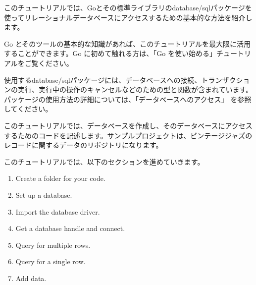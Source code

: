 このチュートリアルでは、Goとその標準ライブラリのdatabase/sqlパッケージを使ってリレーショナルデータベースにアクセスするための基本的な方法を紹介します。

Go とそのツールの基本的な知識があれば、このチュートリアルを最大限に活用することができます。Go に初めて触れる方は、「Go を使い始める」チュートリアルをご覧ください。

使用するdatabase/sqlパッケージには、データベースへの接続、トランザクションの実行、実行中の操作のキャンセルなどのための型と関数が含まれています。パッケージの使用方法の詳細については、「データベースへのアクセス」 を参照してください。

このチュートリアルでは、データベースを作成し、そのデータベースにアクセスするためのコードを記述します。サンプルプロジェクトは、ビンテージジャズのレコードに関するデータのリポジトリになります。

このチュートリアルでは、以下のセクションを進めていきます。

\begin{enumerate}
\item Create a folder for your code.
\item Set up a database.
\item Import the database driver.
\item Get a database handle and connect.
\item Query for multiple rows.
\item Query for a single row.
\item Add data.
\end{enumerate}